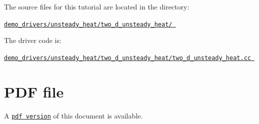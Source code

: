 \begin{DoxyItemize}
\item The source files for this tutorial are located in the directory\+: \begin{center} \href{../../../../demo_drivers/unsteady_heat/two_d_unsteady_heat/}{\tt demo\+\_\+drivers/unsteady\+\_\+heat/two\+\_\+d\+\_\+unsteady\+\_\+heat/ } \end{center} 
\item The driver code is\+: \begin{center} \href{../../../../demo_drivers/unsteady_heat/two_d_unsteady_heat/two_d_unsteady_heat.cc}{\tt demo\+\_\+drivers/unsteady\+\_\+heat/two\+\_\+d\+\_\+unsteady\+\_\+heat/two\+\_\+d\+\_\+unsteady\+\_\+heat.\+cc } \end{center} 
\end{DoxyItemize}



 

 \hypertarget{index_pdf}{}\section{P\+D\+F file}\label{index_pdf}
A \href{../latex/refman.pdf}{\tt pdf version} of this document is available. 

